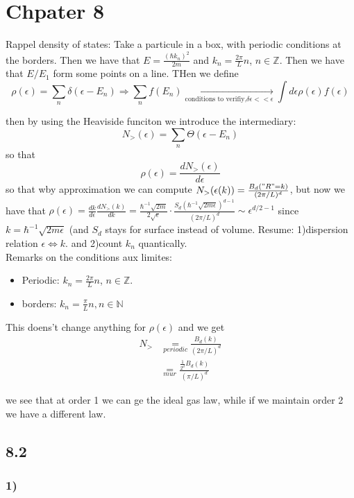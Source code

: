 \documentclass[10pt,a4paper]{book}
\newcommand{\Z}{\mathbb{Z}}
\begin{document}
\chapter*{Chpater 8}
Rappel density of states:
Take a particule in a box, with periodic conditions at the borders. Then we have that $E=\frac{(\hbar k_n)^2}{2m}$ and $k_n=\frac{2\pi}{L}n$, $n\in\mathbb{Z}$. Then we have that  $E/E_1$ form some points on a line. THen we define
$$\rho(\epsilon)=\sum_n\delta(\epsilon-E_n)\Rightarrow \sum_nf(E_n)\underset{\text{conditions to verifiy,} \delta \epsilon<<\epsilon}{\to}\int d\epsilon\rho(\epsilon)f(\epsilon)$$

then by using the Heaviside funciton we introduce the intermediary:
$$N_{>}(\epsilon)=\sum_n\Theta(\epsilon-E_n)$$ so that
$$\rho(\epsilon)=\frac{dN_{>}(\epsilon)}{d\epsilon}$$
so that wby approximation we can compute $N_{>}(\epsilon(k))=\frac{B_d("R"=k)}{(2\pi/L)^d}$, but now we have that $\rho(\epsilon)=\frac{dk}{d\epsilon}\frac{dN_{>}(k)}{dk}=\frac{\hbar^{-1}\sqrt{2m}}{2\sqrt{\epsilon}}\cdot \frac{S_d(\hbar^{-1}\sqrt{2m\epsilon})^{d-1}}{(2\pi/L)^d}\sim \epsilon^{d/2-1}$ since $k=\hbar^{-1}\sqrt{2m\epsilon}$ (and $S_d$ stays for surface instead of volume. Resume: 1)dispersion relation $\epsilon\Leftrightarrow k$. and 2)count $k_n$ quantically. \\
Remarks on the conditions aux limites:
\begin{itemize}
\item Periodic: $k_n=\frac{2\pi}{L}n$, $n\in\Z$.
\item borders: $k_n=\frac{\pi}{L}n,n\in\mathbb{N}$
\end{itemize}

This doens't change anything for $\rho(\epsilon)$ and we get 
\begin{align*}
N_{>}&\underset{periodic}{=}\frac{B_d(k)}{(2\pi/L)^d}\\
&\underset{mur}{=}\frac{\frac{1}{2^d}B_d(k)}{(\pi/L)^d}
\end{align*}

we see that at order 1 we can ge the ideal gas law, while if we maintain order 2 we have a different law.



\section*{8.2}

\subsection*{1)}
\end{document}

